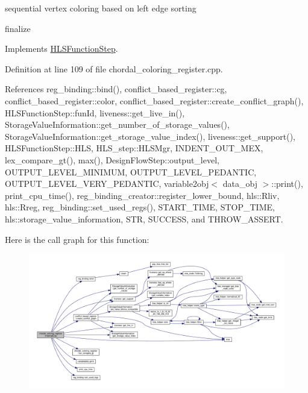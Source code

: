 sequential vertex coloring based on left edge sorting

finalize 

Implements \hyperlink{classHLSFunctionStep_a8db4c00d080655984d98143206fc9fa8}{H\+L\+S\+Function\+Step}.



Definition at line 109 of file chordal\+\_\+coloring\+\_\+register.\+cpp.



References reg\+\_\+binding\+::bind(), conflict\+\_\+based\+\_\+register\+::cg, conflict\+\_\+based\+\_\+register\+::color, conflict\+\_\+based\+\_\+register\+::create\+\_\+conflict\+\_\+graph(), H\+L\+S\+Function\+Step\+::fun\+Id, liveness\+::get\+\_\+live\+\_\+in(), Storage\+Value\+Information\+::get\+\_\+number\+\_\+of\+\_\+storage\+\_\+values(), Storage\+Value\+Information\+::get\+\_\+storage\+\_\+value\+\_\+index(), liveness\+::get\+\_\+support(), H\+L\+S\+Function\+Step\+::\+H\+LS, H\+L\+S\+\_\+step\+::\+H\+L\+S\+Mgr, I\+N\+D\+E\+N\+T\+\_\+\+O\+U\+T\+\_\+\+M\+EX, lex\+\_\+compare\+\_\+gt(), max(), Design\+Flow\+Step\+::output\+\_\+level, O\+U\+T\+P\+U\+T\+\_\+\+L\+E\+V\+E\+L\+\_\+\+M\+I\+N\+I\+M\+UM, O\+U\+T\+P\+U\+T\+\_\+\+L\+E\+V\+E\+L\+\_\+\+P\+E\+D\+A\+N\+T\+IC, O\+U\+T\+P\+U\+T\+\_\+\+L\+E\+V\+E\+L\+\_\+\+V\+E\+R\+Y\+\_\+\+P\+E\+D\+A\+N\+T\+IC, variable2obj$<$ data\+\_\+obj $>$\+::print(), print\+\_\+cpu\+\_\+time(), reg\+\_\+binding\+\_\+creator\+::register\+\_\+lower\+\_\+bound, hls\+::\+Rliv, hls\+::\+Rreg, reg\+\_\+binding\+::set\+\_\+used\+\_\+regs(), S\+T\+A\+R\+T\+\_\+\+T\+I\+ME, S\+T\+O\+P\+\_\+\+T\+I\+ME, hls\+::storage\+\_\+value\+\_\+information, S\+TR, S\+U\+C\+C\+E\+SS, and T\+H\+R\+O\+W\+\_\+\+A\+S\+S\+E\+RT.

Here is the call graph for this function\+:
\nopagebreak
\begin{figure}[H]
\begin{center}
\leavevmode
\includegraphics[width=350pt]{d9/db4/classchordal__coloring__register_a28bdde20568880c6b074dcff39d0bf83_cgraph}
\end{center}
\end{figure}
\mbox{\label{classchordal__coloring__register_abef21ed03d914721aabd0cad2160fbb7}} 
